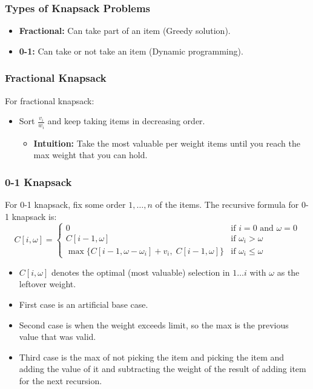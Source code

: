 \subsubsection{Types of Knapsack Problems}
\begin{definition}
    \begin{itemize}
        \item \textbf{Fractional:} Can take part of an item (Greedy solution).
        \item \textbf{0-1:} Can take or not take an item (Dynamic programming).
    \end{itemize}
\end{definition}

\subsubsection{Fractional Knapsack}
\begin{definition}
For fractional knapsack:
\begin{itemize}
    \item Sort $\frac{v_i}{w_i}$ and keep taking items in decreasing order.
    \begin{itemize}
        \item \textbf{Intuition:} Take the most valuable per weight items until you reach the max weight that you can hold.
    \end{itemize}
\end{itemize}
\end{definition}

\subsubsection{0-1 Knapsack}
\begin{definition}
    For 0-1 knapsack, fix some order $1, \dots, n$ of the items. The recursive formula for 0-1 knapsack is:
    \[
    C[i, \omega] = \begin{cases} 
        0 & \text{if } i = 0 \text{ and } \omega = 0 \\
        C[i-1, \omega] & \text{if } \omega_i > \omega \\
        \max \{C[i-1, \omega - \omega_i] +v_i, \; C[i-1, \omega]\} & \text{if } \omega_i \leq \omega
    \end{cases}
    \]
    \begin{itemize}
        \item $C[i, \omega]$ denotes the optimal (most valuable) selection in $1\ldots i$ with $\omega$ as the leftover weight.
        \item First case is an artificial base case.
        \item Second case is when the weight exceeds limit, so the max is the previous value that was valid. 
        \item Third case is the max of not picking the item and picking the item and adding the value of it and subtracting the weight of the result of adding item for the next recursion.
    \end{itemize}
\end{definition}

